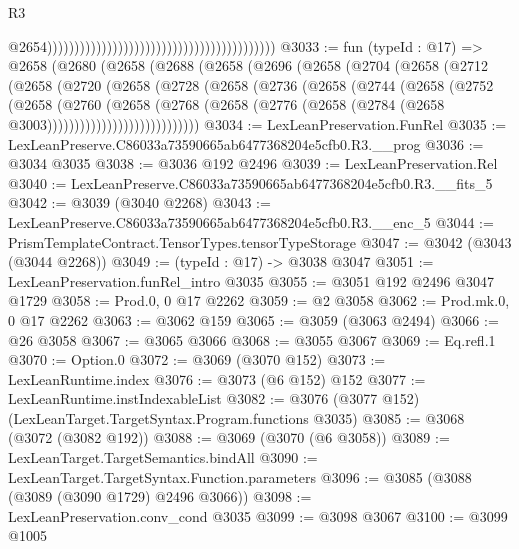 \begin{lexlean}{R3}
\begin{coremodule}
                                                                                        @2654))))))))))))))))))))))))))))))))))))))))))
@3033 := fun (typeId : @17) =>
  @2658
    (@2680
      (@2658
        (@2688
          (@2658
            (@2696
              (@2658
                (@2704
                  (@2658
                    (@2712
                      (@2658
                        (@2720
                          (@2658
                            (@2728
                              (@2658
                                (@2736
                                  (@2658
                                    (@2744
                                      (@2658
                                        (@2752
                                          (@2658
                                            (@2760
                                              (@2658
                                                (@2768
                                                  (@2658
                                                    (@2776
                                                      (@2658
                                                        (@2784
                                                          (@2658 @3003))))))))))))))))))))))))))))
@3034 := LexLeanPreservation.FunRel
@3035 := LexLeanPreserve.C86033a73590665ab6477368204e5cfb0.R3.__prog
@3036 := @3034 @3035
@3038 := @3036 @192 @2496
@3039 := LexLeanPreservation.Rel
@3040 := LexLeanPreserve.C86033a73590665ab6477368204e5cfb0.R3.__fits_5
@3042 := @3039 (@3040 @2268)
@3043 := LexLeanPreserve.C86033a73590665ab6477368204e5cfb0.R3.__enc_5
@3044 := PrismTemplateContract.TensorTypes.tensorTypeStorage
@3047 := @3042 (@3043 (@3044 @2268))
@3049 := (typeId : @17) -> @3038 @3047
@3051 := LexLeanPreservation.funRel_intro @3035
@3055 := @3051 @192 @2496 @3047 @1729
@3058 := Prod.{0, 0} @17 @2262
@3059 := @2 @3058
@3062 := Prod.mk.{0, 0} @17 @2262
@3063 := @3062 @159
@3065 := @3059 (@3063 @2494)
@3066 := @26 @3058
@3067 := @3065 @3066
@3068 := @3055 @3067
@3069 := Eq.refl.{1}
@3070 := Option.{0}
@3072 := @3069 (@3070 @152)
@3073 := LexLeanRuntime.index
@3076 := @3073 (@6 @152) @152
@3077 := LexLeanRuntime.instIndexableList
@3082 := @3076 (@3077 @152) (LexLeanTarget.TargetSyntax.Program.functions @3035)
@3085 := @3068 (@3072 (@3082 @192))
@3088 := @3069 (@3070 (@6 @3058))
@3089 := LexLeanTarget.TargetSemantics.bindAll
@3090 := LexLeanTarget.TargetSyntax.Function.parameters
@3096 := @3085 (@3088 (@3089 (@3090 @1729) @2496 @3066))
@3098 := LexLeanPreservation.conv_cond @3035
@3099 := @3098 @3067
@3100 := @3099 @1005

\end{coremodule}
\end{lexlean}
